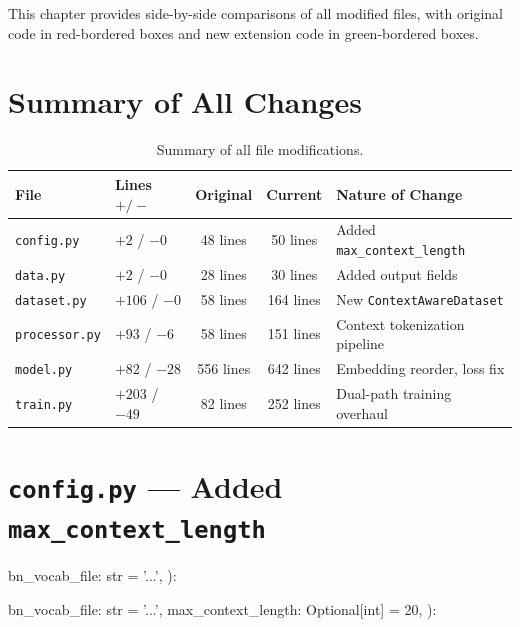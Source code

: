 \documentclass[11pt, a4paper]{report}
\begin{document}
This chapter provides side-by-side comparisons of all modified files, with original code in \textcolor{red!60!black}{red-bordered} boxes and new extension code in \textcolor{green!60!black}{green-bordered} boxes.

\section{Summary of All Changes}
\label{sec:change-summary}

\begin{table}[h]
\centering
\caption{Summary of all file modifications.}
\label{tab:change-summary}
\begin{tabular}{llccl}
\toprule
\textbf{File} & \textbf{Lines $+/-$} & \textbf{Original} & \textbf{Current} & \textbf{Nature of Change} \\
\midrule
\texttt{config.py} & $+2$ / $-0$ & 48 lines & 50 lines & Added \texttt{max\_context\_length} \\
\texttt{data.py} & $+2$ / $-0$ & 28 lines & 30 lines & Added output fields \\
\texttt{dataset.py} & $+106$ / $-0$ & 58 lines & 164 lines & New \texttt{ContextAwareDataset} \\
\texttt{processor.py} & $+93$ / $-6$ & 58 lines & 151 lines & Context tokenization pipeline \\
\texttt{model.py} & $+82$ / $-28$ & 556 lines & 642 lines & Embedding reorder, loss fix \\
\texttt{train.py} & $+203$ / $-49$ & 82 lines & 252 lines & Dual-path training overhaul \\
\bottomrule
\end{tabular}
\end{table}


\section{\texttt{config.py} --- Added \texttt{max\_context\_length}}
\label{sec:code-config}

\begin{minipage}[t]{0.48\textwidth}
\begin{originalcode}
bn_vocab_file: str = '...',
):
\end{originalcode}
\end{minipage}
\hfill
\begin{minipage}[t]{0.48\textwidth}
\begin{newcode}
bn_vocab_file: str = '...',
max_context_length: Optional[int] = 20,
):
\end{newcode}
\end{minipage}
\end{document}
